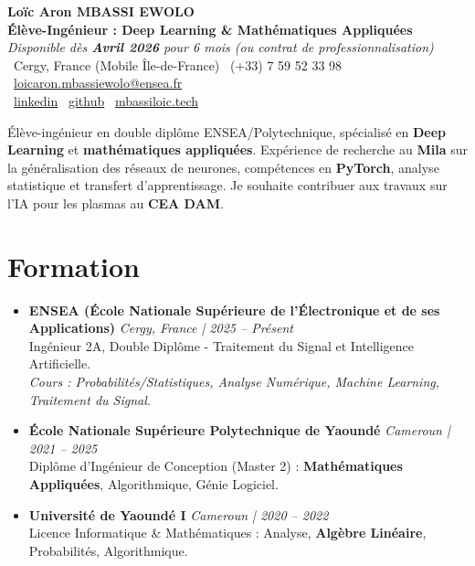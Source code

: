\documentclass[a4paper,11pt]{article}
\begin{document}
\begin{center}
    {\Large \textbf{Loïc Aron MBASSI EWOLO}} \\ \vspace{4pt}
    \textbf{\large Élève-Ingénieur : Deep Learning \& Mathématiques Appliquées} \\
    \textit{\small Disponible dès \textbf{Avril 2026} pour 6 mois (ou contrat de professionnalisation)} \\ \vspace{4pt}
    \small
    \faMapMarker\ Cergy, France (Mobile Île-de-France) \quad
    \faPhone\ (+33) 7 59 52 33 98 \quad
    \faEnvelope\ \href{mailto:loicaron.mbassiewolo@ensea.fr}{loicaron.mbassiewolo@ensea.fr} \\ \vspace{2pt}
    \faLinkedin\ \href{https://www.linkedin.com/in/loic-aron-mbassi-ewolo-3942a9246/}{linkedin} \quad
    \faGithub\ \href{https://github.com/Nameless0l}{github} \quad
    \faGlobe\ \href{https://mbassiloic.tech}{mbassiloic.tech}
\end{center}

\vspace{-6pt}

\noindent\small{Élève-ingénieur en double diplôme ENSEA/Polytechnique, spécialisé en \textbf{Deep Learning} et \textbf{mathématiques appliquées}. Expérience de recherche au \textbf{Mila} sur la généralisation des réseaux de neurones, compétences en \textbf{PyTorch}, analyse statistique et transfert d'apprentissage. Je souhaite contribuer aux travaux sur l'IA pour les plasmas au \textbf{CEA DAM}.}

\section{Formation}
\begin{itemize}[leftmargin=*, label={.}, nosep]
    \item \textbf{ENSEA (École Nationale Supérieure de l'Électronique et de ses Applications)} \hfill \textit{Cergy, France | 2025 -- Présent} \\
    \small{Ingénieur 2A, Double Diplôme - Traitement du Signal et Intelligence Artificielle.} \\
    \textit{\small{Cours : Probabilités/Statistiques, Analyse Numérique, Machine Learning, Traitement du Signal.}}
    \vspace{2pt}
    \item \textbf{École Nationale Supérieure Polytechnique de Yaoundé} \hfill \textit{Cameroun | 2021 -- 2025} \\
    \small{Diplôme d'Ingénieur de Conception (Master 2) : \textbf{Mathématiques Appliquées}, Algorithmique, Génie Logiciel.}
    \item \textbf{Université de Yaoundé I} \hfill \textit{Cameroun | 2020 -- 2022} \\
    \small{Licence Informatique \& Mathématiques : Analyse, \textbf{Algèbre Linéaire}, Probabilités, Algorithmique.}
\end{itemize}
\end{document}
